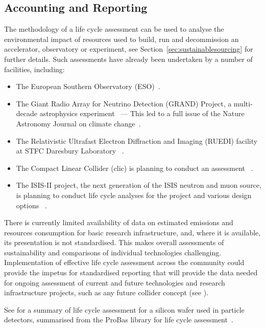 \documentclass[../SustainableHEP.tex]{subfiles}
\begin{document}

\subsection{Accounting and Reporting}





The methodology of a life cycle assessment can be used to analyse the environmental impact of resources used to build, run and decommission an accelerator, observatory or experiment, see Section~\ref{sec:sustainablesourcing} for further details. Such assessments have already been undertaken by a number of facilities, including:
\begin{itemize}
    \item The European Southern Observatory (ESO)~\cite{ESO}.
    \item The Giant Radio Array for Neutrino Detection (GRAND) Project, a multi-decade astrophysics experiment~\cite{Aujoux_2021} --- This led to a full issue of the Nature Astronomy Journal on climate change~\cite{NatureClimateIssue}.
    \item The Relativistic Ultrafast Electron Diffraction and Imaging (RUEDI) facility at STFC Daresbury Laboratory ~\cite{Shepard}.
    \item The Compact Linear Collider (\acrshort{clic}) is planning to conduct an assessment ~\cite{privateBList}.
    \item The ISIS-II project, the next generation of the ISIS neutron and muon source, is planning to conduct life cycle analyses for the project and various design options ~\cite{ISISII}.
\end{itemize}

There is currently limited availability of data on estimated emissions and resources consumption for basic research infrastructure, and, where it is available, its presentation is not standardised. This makes overall assessments of sustainability and comparisons of individual technologies challenging. Implementation of effective life cycle assessment across the \ACR community could provide the impetus for standardised reporting that will provide the data needed for ongoing assessment of current and future technologies and research infrastructure projects, such as any future collider concept (see ).

See  for a summary of life cycle assessment for a silicon wafer used in particle detectors, summarised from the ProBas library for life cycle assessment~\cite{ProBasSi}.
\end{document}
